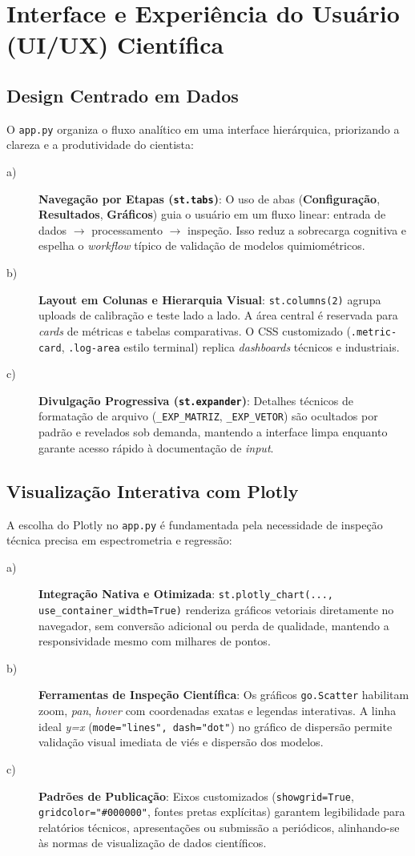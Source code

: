 \chapter{Interface e Experiência do Usuário (UI/UX) Científica}
\section{Design Centrado em Dados}
O \verb|app.py| organiza o fluxo analítico em uma interface hierárquica, priorizando a clareza e a produtividade do cientista:
\begin{description}
\item[a)] \textbf{Navegação por Etapas (\texttt{st.tabs})}: O uso de abas (\textbf{Configuração}, \textbf{Resultados}, \textbf{Gráficos}) guia o usuário em um fluxo linear: entrada de dados $\rightarrow$ processamento $\rightarrow$ inspeção. Isso reduz a sobrecarga cognitiva e espelha o \textit{workflow} típico de validação de modelos quimiométricos.
\item[b)] \textbf{Layout em Colunas e Hierarquia Visual}: \verb|st.columns(2)| agrupa uploads de calibração e teste lado a lado. A área central é reservada para \textit{cards} de métricas e tabelas comparativas. O CSS customizado (\verb|.metric-card|, \verb|.log-area| estilo terminal) replica \textit{dashboards} técnicos e industriais.
\item[c)] \textbf{Divulgação Progressiva (\texttt{st.expander})}: Detalhes técnicos de formatação de arquivo (\verb|_EXP_MATRIZ|, \verb|_EXP_VETOR|) são ocultados por padrão e revelados sob demanda, mantendo a interface limpa enquanto garante acesso rápido à documentação de \textit{input}.
\end{description}

\section{Visualização Interativa com Plotly}
A escolha do Plotly no \verb|app.py| é fundamentada pela necessidade de inspeção técnica precisa em espectrometria e regressão:
\begin{description}
\item[a)] \textbf{Integração Nativa e Otimizada}: \verb|st.plotly_chart(..., use_container_width=True)| renderiza gráficos vetoriais diretamente no navegador, sem conversão adicional ou perda de qualidade, mantendo a responsividade mesmo com milhares de pontos.
\item[b)] \textbf{Ferramentas de Inspeção Científica}: Os gráficos \verb|go.Scatter| habilitam zoom, \textit{pan}, \textit{hover} com coordenadas exatas e legendas interativas. A linha ideal \textit{y=x} (\verb|mode="lines", dash="dot"|) no gráfico de dispersão permite validação visual imediata de viés e dispersão dos modelos.
\item[c)] \textbf{Padrões de Publicação}: Eixos customizados (\verb|showgrid=True|, \verb|gridcolor="#000000"|, fontes pretas explícitas) garantem legibilidade para relatórios técnicos, apresentações ou submissão a periódicos, alinhando-se às normas de visualização de dados científicos.
\end{description}

